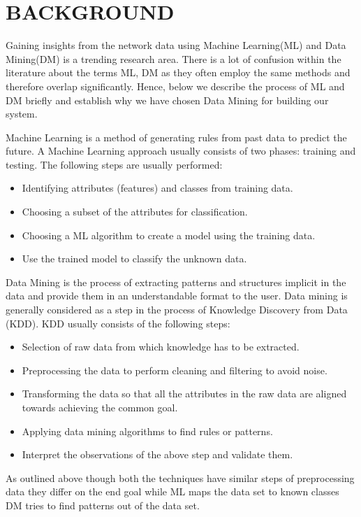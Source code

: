 
\chapter{BACKGROUND}

Gaining insights from the network data using Machine Learning(ML) and Data Mining(DM) is a trending research area. There is a lot of confusion within the literature about the terms ML, DM as they often employ the same methods and therefore overlap significantly. Hence, below we describe the process of ML and DM briefly and establish why we have chosen Data Mining for building our system.

Machine Learning is a method of generating rules from past data to predict the future.
A Machine Learning approach usually consists of two phases:
training and testing. The following steps are usually performed:
\begin{itemize}
	\item Identifying attributes (features) and classes from training data.
	\item Choosing a subset of the attributes for classification.
	\item Choosing a ML algorithm to create a model using the training data.
	\item Use the trained model to classify the unknown data.
\end{itemize}	

Data Mining is the process of extracting patterns and structures implicit in the data and provide them in an understandable format to the user. Data mining is generally considered as a step in the process of Knowledge Discovery from Data (KDD). KDD usually consists of the following steps:
\begin{itemize}
	\item Selection of raw data from which knowledge has to be extracted.
	\item Preprocessing the data to perform cleaning and filtering to avoid noise.
	\item Transforming the data so that all the attributes in the raw data are aligned towards achieving the common goal. 
	\item Applying data mining algorithms to find rules or patterns.
	\item Interpret the observations of the above step and validate them.
	
\end{itemize}

As outlined above though both the techniques have similar steps of preprocessing data they differ on the end goal while ML maps the data set to known classes DM tries to find patterns out of the data set.

